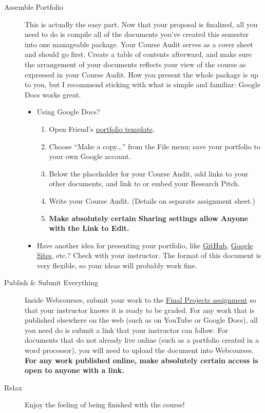 \documentclass[11pt,oneside]{amsart}	%
\begin{document}
\begin{description}
	\item[Assemble Portfolio]  This is actually the easy part. Now that your proposal is finalized, all you need to do is compile all of the documents you've created this semester into one manageable package. Your Course Audit serves as a cover sheet and should go first. Create a table of contents afterward, and make sure the arrangement of your documents reflects your view of the course as expressed in your Course Audit. How you present the whole package is up to you, but I recommend sticking with what is simple and familiar: Google Docs works great.
	\begin{itemize}
		\item Using Google Docs?
		\begin{enumerate}
			\item Open Friend's \href{https://docs.google.com/document/d/1iAnB0vb4Jo_ezOEuCqSu1nGX4AfqvYvmD1BSNna1SzM/edit?usp=sharing}{portfolio template}.
			\item Choose ``Make a copy…'' from the File menu; save your portfolio to your own Google account.
			\item Below the placeholder for your Course Audit, add links to your other documents, and link to or embed your Research Pitch.
			\item Write your Course Audit. (Details on separate assignment sheet.)
			\item \textbf{Make absolutely certain Sharing settings allow Anyone with the Link to Edit.}
		\end{enumerate}
		\item Have another idea for presenting your portfolio, like \href{https://github.com}{GitHub}, \href{https://sites.google.com}{Google Sites}, etc.? Check with your instructor. The format of this document is very flexible, so your ideas will probably work fine.
	\end{itemize}
	\item[Publish \& Submit Everything] Inside Webcourses, submit your work to the \href{https://webcourses2c.instructure.com/courses/985581/assignments/2821738}{Final Projects assignment} so that your instructor knows it is ready to be graded. For any work that is published elsewhere on the web (such as on YouTube or Google Docs), all you need do is submit a link that your instructor can follow. For documents that do not already live online (such as a portfolio created in a word processor), you will need to upload the document into Webcourses. \textbf{For any work published online, make absolutely certain access is open to anyone with a link.}
	\item[Relax] Enjoy the feeling of being finished with the course!
\end{description}
\end{document}
